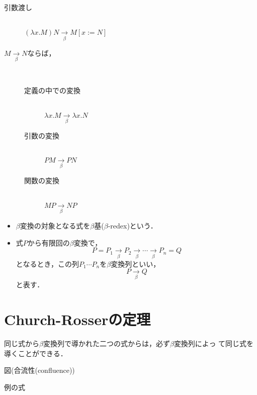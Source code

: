 \begin{description}
 \item[引数渡し]  \mbox{} \\
            $(\lambda x . M) N \underset{\beta}{\longrightarrow} M[x:=N]$ 

 \item[$M \underset{\beta}{\longrightarrow} N$ならば，] \mbox{} \\
            \begin{description}
             \item[定義の中での変換] \mbox{} \\
                        $\lambda x . M \underset{\beta}{\longrightarrow} \lambda x . N$ 

             \item[引数の変換]  \mbox{} \\
                        $ PM \underset{\beta}{\longrightarrow} PN$ 
             \item[関数の変換]  \mbox{} \\
                        $MP \underset{\beta}{\longrightarrow} NP$
            \end{description}
\end{description}


\begin{itemize}
 \item $\beta$変換の対象となる式を$\beta$基($\beta$-redex)という．
 \item 式$P$から有限回の$\beta$変換で，
       \[
        P = P_1 \underset{\beta}{\longrightarrow} P_2 \underset{\beta}{\longrightarrow} \cdots
       \underset{\beta}{\longrightarrow} P_n = Q
       \]
       となるとき，この列$P_1 \cdots P_n$を$\beta$変換列といい，
       \[
        P \underset{\beta}{\longrightarrow} Q
       \]
       と表す．
\end{itemize}

\section{Church-Rosserの定理}
同じ式から$\beta$変換列で導かれた二つの式からは，必ず$\beta$変換列によっ
て同じ式を導くことができる．

図(合流性(confluence))


例の式
